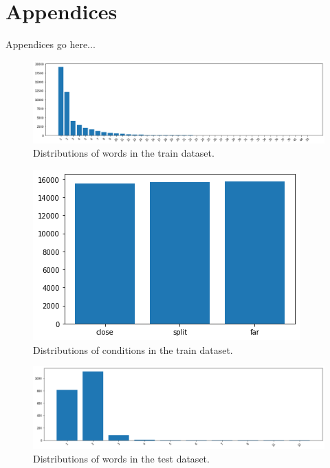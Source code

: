\section{Appendices}
\label{sec:appendix}

Appendices go here...

\begin{figure}[ht]
\centering
\includegraphics[width=\columnwidth]{assets/trainset_words.png}
\caption[Train dataset words]
{Distributions of words in the train dataset.}
\label{figure:trainset-words}
\end{figure}

\begin{figure}[ht]
\centering
\includegraphics[width=\columnwidth]{assets/trainset_conditions.png}
\caption[Train dataset words]
{Distributions of conditions in the train dataset.}
\label{figure:trainset-conditions}
\end{figure}

\begin{figure}[ht]
\centering
\includegraphics[width=\columnwidth]{assets/testset_words.png}
\caption[Test dataset words]
{Distributions of words in the test dataset.}
\label{figure:testset-words}
\end{figure}

